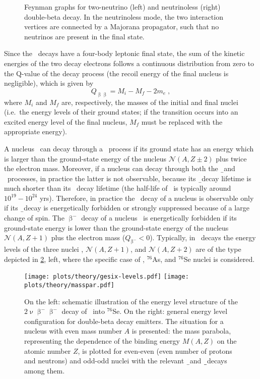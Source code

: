 \begin{figure}
  \centering%
  \caption{%
    Feynman graphs for two-neutrino (left) and neutrinoless (right) double-beta decay. In
    the neutrinoless mode, the two interaction vertices are connected by a Majorana
    propagator, such that no neutrinos are present in the final state.
  }\label{fig:nbb:feydiag}
\end{figure}

Since the \nnbb\ decays have a four-body leptonic final state, the sum of the kinetic
energies of the two decay electrons follows a continuous distribution from zero to the
Q-value of the decay process (the recoil energy of the final nucleus is negligible), which
is given by
\[
  Q_{\upbeta\upbeta} = M_i - M_f - 2m_e \;,
\]
where $M_i$ and $M_f$ are, respectively, the masses of the initial and final nuclei
(i.e.~the energy levels of their ground states; if the transition occurs into an excited
energy level of the final nucleus, $M_f$ must be replaced with the appropriate energy).

A nucleus \NAZ\ can decay through a \nnbb\ process if its ground state has an energy which
is larger than the ground-state energy of the nucleus $\mathcal{N}(A,Z\pm2)$ plus twice
the electron mass. Moreover, if a nucleus can decay through both the \b\ and \nnbb\
processes, in practice the latter is not observable, because its \b\ decay lifetime is
much shorter than its \nnbb\ decay lifetime (the half-life of \nnbb\ is typically around
$10^{19}-10^{24}$ yrs). Therefore, in practice the \nnbb\ decay of a nucleus is observable
only if its \b\ decay is energetically forbidden or strongly suppressed because of a large
change of spin. The $\upbeta^-$ decay of a nucleus \NAZ\ is energetically forbidden if its
ground-state energy is lower than the ground-state energy of the nucleus
$\mathcal{N}(A,Z+1)$ plus the electron mass ($Q_{\upbeta^{-}} < 0$).  Typically, in
\nnbbm\ decays the energy levels of the three nuclei \NAZ, $\mathcal{N}(A,Z+1)$, and
$\mathcal{N}(A,Z+2)$ are of the type depicted in \cref{fig:nbb:gesixlevels}, left, where
the specific case of \gesix, $^{76}$As, and $^{76}$Se nuclei is considered.

\begin{figure}
  \centering
  \texttt{[image: plots/theory/gesix-levels.pdf]}%
  \texttt{[image: plots/theory/masspar.pdf]}%
  \caption{%
    On the left: schematic illustration of the energy level structure of the
    $2\upnu\upbeta^-\upbeta^-$ decay of \gesix\ into $^{76}$Se. On the right: general
    energy level configuration for double-beta decay emitters.  The situation for a
    nucleus with even mass number $A$ is presented: the mass parabola, representing the
    dependence of the binding energy $M(A,Z)$ on the atomic number $Z$, is plotted for
    even-even (even number of protons and neutrons) and odd-odd nuclei with the relevant
    \b\ and \b\b\ decays among them.
  }\label{fig:nbb:gesixlevels}
\end{figure}

